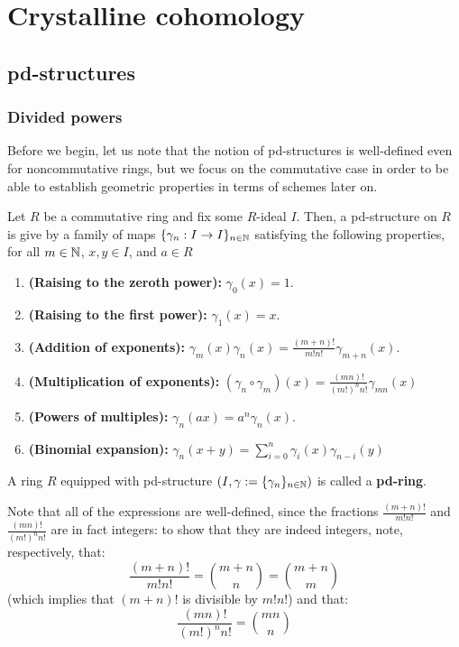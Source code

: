 \section{Crystalline cohomology}
    \subsection{pd-structures}
        \subsubsection{Divided powers}
            \begin{remark}
                Before we begin, let us note that the notion of pd-structures is well-defined even for noncommutative rings, but we focus on the commutative case in order to be able to establish geometric properties in terms of schemes later on. 
            \end{remark}
            \begin{definition} \label{def: pd_structures}
                Let $R$ be a commutative ring and fix some $R$-ideal $I$. Then, a pd-structure on $R$ is give by a family of maps $\{\gamma_n: I \to I\}_{n \in \mathbb{N}}$ satisfying the following properties, for all $m \in \mathbb{N}$, $x, y \in I$, and $a \in R$
                    \begin{enumerate}
                        \item \textbf{(Raising to the zeroth power):} $\gamma_0(x) = 1$.
                        \item \textbf{(Raising to the first power):} $\gamma_1(x) = x$.
                        \item \textbf{(Addition of exponents):} $\gamma_m(x)\gamma_n(x) = \frac{(m + n)!}{m!n!} \gamma_{m + n}(x)$.
                        \item \textbf{(Multiplication of exponents):} $(\gamma_n \circ \gamma_m)(x) = \frac{(mn)!}{(m!)^n n!} \gamma_{mn}(x)$
                        \item \textbf{(Powers of multiples):} $\gamma_n(ax) = a^n\gamma_n(x)$.
                        \item \textbf{(Binomial expansion):} $\gamma_n(x + y) = \sum_{i=0}^n \gamma_i(x)\gamma_{n - i}(y)$
                    \end{enumerate}
                A ring $R$ equipped with pd-structure $\left(I, \gamma := \{\gamma_n\}_{n \in \mathbb{N}}\right)$ is called a \textbf{pd-ring}. 
            \end{definition}
            \begin{remark}
                Note that all of the expressions are well-defined, since the fractions $\frac{(m + n)!}{m!n!}$ and $\frac{(mn)!}{(m!)^n n!}$ are in fact integers: to show that they are indeed integers, note, respectively, that:
                    $$\frac{(m + n)!}{m!n!} = \binom{m + n}{n} = \binom{m + n}{m}$$
                (which implies that $(m + n)!$ is divisible by $m!n!$) and that:
                    $$\frac{(mn)!}{(m!)^n n!} = \binom{mn}{n}$$
            \end{remark}
            

